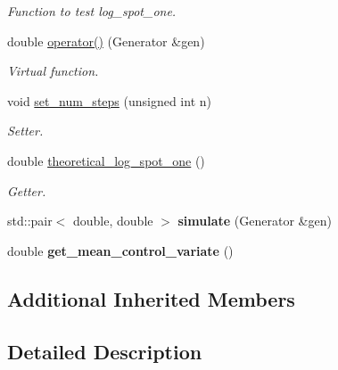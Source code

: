 \begin{DoxyCompactItemize}
\begin{DoxyCompactList}\small\item\em Function to test log\+\_\+spot\+\_\+one. \end{DoxyCompactList}\item 
double \hyperlink{classoption_a74c39ed0494f2e66bd92ea84bd5dfa4b}{operator()} (Generator \&gen)\hypertarget{classoption_a74c39ed0494f2e66bd92ea84bd5dfa4b}{}\label{classoption_a74c39ed0494f2e66bd92ea84bd5dfa4b}

\begin{DoxyCompactList}\small\item\em Virtual function. \end{DoxyCompactList}\item 
void \hyperlink{classoption_a77b5efa87751a2e506de485483bbd6d8}{set\+\_\+num\+\_\+steps} (unsigned int n)\hypertarget{classoption_a77b5efa87751a2e506de485483bbd6d8}{}\label{classoption_a77b5efa87751a2e506de485483bbd6d8}

\begin{DoxyCompactList}\small\item\em Setter. \end{DoxyCompactList}\item 
double \hyperlink{classoption_a89c94c4ac7adbacbd9e9e667063e78d5}{theoretical\+\_\+log\+\_\+spot\+\_\+one} ()\hypertarget{classoption_a89c94c4ac7adbacbd9e9e667063e78d5}{}\label{classoption_a89c94c4ac7adbacbd9e9e667063e78d5}

\begin{DoxyCompactList}\small\item\em Getter. \end{DoxyCompactList}\item 
std\+::pair$<$ double, double $>$ {\bfseries simulate} (Generator \&gen)\hypertarget{classoption_ab40f18be710881323f35c3589485b602}{}\label{classoption_ab40f18be710881323f35c3589485b602}

\item 
double {\bfseries get\+\_\+mean\+\_\+control\+\_\+variate} ()\hypertarget{classoption_ab19b308a078fdd3812e6cc4f2afe1ec1}{}\label{classoption_ab19b308a078fdd3812e6cc4f2afe1ec1}

\end{DoxyCompactItemize}
\subsection*{Additional Inherited Members}


\subsection{Detailed Description}
